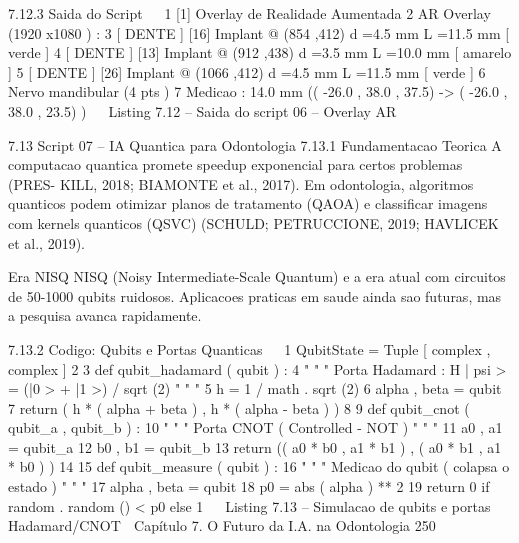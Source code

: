     7.12.3      Saida do Script
                                                                                            
 1       [1] Overlay de Realidade Aumentada
 2       AR Overlay (1920 x1080 ) :
 3         [ DENTE ] [16] Implant @ (854 ,412) d =4.5 mm L =11.5 mm [ verde ]
 4         [ DENTE ] [13] Implant @ (912 ,438) d =3.5 mm L =10.0 mm [ amarelo ]
 5         [ DENTE ] [26] Implant @ (1066 ,412) d =4.5 mm L =11.5 mm [ verde ]
 6         Nervo mandibular (4 pts )
 7         Medicao : 14.0 mm (( -26.0 , 38.0 , 37.5) -> ( -26.0 , 38.0 , 23.5) )
                                                                                            
                              Listing 7.12 – Saida do script 06 – Overlay AR



     7.13        Script 07 – IA Quantica para Odontologia
     7.13.1      Fundamentacao Teorica
     A computacao quantica promete speedup exponencial para certos problemas (PRES-
     KILL, 2018; BIAMONTE et al., 2017). Em odontologia, algoritmos quanticos podem
     otimizar planos de tratamento (QAOA) e classificar imagens com kernels quanticos
     (QSVC) (SCHULD; PETRUCCIONE, 2019; HAVLICEK et al., 2019).

         Era NISQ NISQ (Noisy Intermediate-Scale Quantum) e a era atual com circuitos
         de 50-1000 qubits ruidosos. Aplicacoes praticas em saude ainda sao futuras, mas
         a pesquisa avanca rapidamente.


     7.13.2      Codigo: Qubits e Portas Quanticas
                                                                                            
 1   QubitState = Tuple [ complex , complex ]
 2
 3   def qubit_hadamard ( qubit ) :
 4       " " " Porta Hadamard : H | psi > = (|0 > + |1 >) / sqrt (2) " " "
 5       h = 1 / math . sqrt (2)
 6       alpha , beta = qubit
 7       return ( h * ( alpha + beta ) , h * ( alpha - beta ) )
 8
 9   def qubit_cnot ( qubit_a , qubit_b ) :
10       " " " Porta CNOT ( Controlled - NOT ) " " "
11       a0 , a1 = qubit_a
12       b0 , b1 = qubit_b
13       return (( a0 * b0 , a1 * b1 ) , ( a0 * b1 , a1 * b0 ) )
14
15   def qubit_measure ( qubit ) :
16       " " " Medicao do qubit ( colapsa o estado ) " " "
17       alpha , beta = qubit
18       p0 = abs ( alpha ) ** 2
19       return 0 if random . random () < p0 else 1
                                                                                            
                    Listing 7.13 – Simulacao de qubits e portas Hadamard/CNOT
     Capítulo 7. O Futuro da I.A. na Odontologia                                  250


